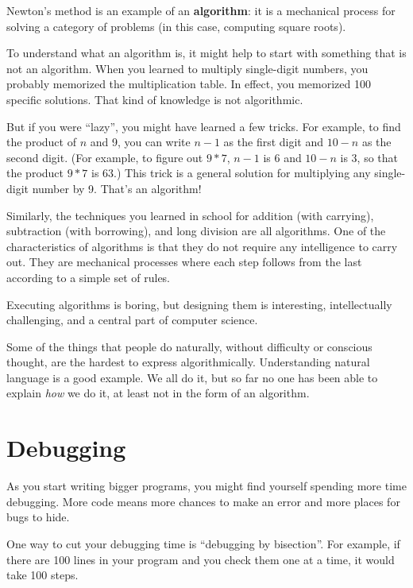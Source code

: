 Newton's method is an example of an {\bf algorithm}: it is a
mechanical process for solving a category of problems (in this
case, computing square roots).

To understand what an algorithm is, it might help to start with
something that is not an algorithm.  When you learned to multiply
single-digit numbers, you probably memorized the multiplication table.
In effect, you memorized 100 specific solutions.  That kind of
knowledge is not algorithmic.

But if you were ``lazy'', you might have learned a few
tricks.  For example, to find the product of $n$ and 9, you can
write $n-1$ as the first digit and $10-n$ as the second
digit.  (For example, to figure out $9*7$, $n-1$ is 6 and 
$10-n$ is 3, so that the product $9*7$ is 63.) This trick 
is a general solution for multiplying any single-digit 
number by 9.  That's an algorithm!

Similarly, the techniques you learned in school for addition 
(with carrying), subtraction (with borrowing), and long 
division are all algorithms.  One
of the characteristics of algorithms is that they do not require any
intelligence to carry out.  They are mechanical processes where
each step follows from the last according to a simple set of rules.

Executing algorithms is boring, but designing them is interesting,
intellectually challenging, and a central part of computer science.

Some of the things that people do naturally, without difficulty or
conscious thought, are the hardest to express algorithmically.
Understanding natural language is a good example.  We all do it, but
so far no one has been able to explain {\em how} we do it, at least
not in the form of an algorithm.


\section{Debugging}
\label{bisectbug}

As you start writing bigger programs, you might find yourself
spending more time debugging.  More code means more chances to
make an error and more places for bugs to hide.

One way to cut your debugging time is ``debugging by bisection''.
For example, if there are 100 lines in your program and you
check them one at a time, it would take 100 steps.

